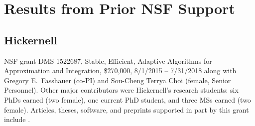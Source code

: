 \documentclass[11pt]{NSFamsart}
\begin{document}
{ %
\section{Results from Prior NSF Support}
 
\subsection*{Hickernell} NSF grant DMS-1522687, Stable, Efficient, Adaptive Algorithms for Approximation and Integration,
		\$270,000, 8/1/2015 -- 7/31/2018 along with Gregory E.\ Fasshauer (co-PI) and  Sou-Cheng Terrya Choi (female, Senior Personnel).  Other major contributors were Hickernell's research students: 
		six PhDs earned (two female), one current PhD student, and three MSs earned (two female).
Articles, theses, software, and preprints supported in
part by this grant include
\cite{ala_augmented_2017, ChoEtal17a, ChoEtal20a, Din15a, DinHic20a, GilEtal16a, Hic17a, HicJag18b, HicJim16a, HicEtal18a, HicEtal17a, HicKriWoz19a, RatHic19a, GilJim16b, JimHic16a, JohFasHic18a, Li16a, Liu17a, MarEtal18a, mccourt_stable_2017, MCCEtal19a, mishra_hybrid_2018, MisEtal19a, rashidinia_stable_2016, rashidinia_stable_2018, Zha18a, Zha17a, Zho15a, ZhoHic15a}.

}
\end{document}
